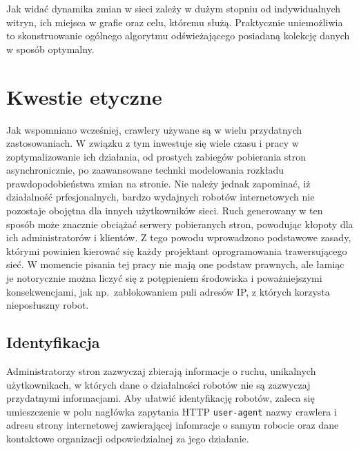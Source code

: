 Jak widać dynamika zmian w sieci zależy w dużym stopniu od indywidualnych witryn, ich miejsca w grafie oraz
celu, któremu służą. Praktycznie uniemożliwia to skonstruowanie ogólnego algorytmu odświeżającego posiadaną
kolekcję danych w sposób optymalny.


\section{Kwestie etyczne}
\label{sec:etyczne}
Jak wspomniano wcześniej, crawlery używane są w wielu przydatnych zastosowaniach. W związku z tym inwestuje się wiele czasu i pracy w zoptymalizowanie
ich działania, od prostych zabiegów pobierania stron asynchronicznie, po zaawansowane technki modelowania rozkładu prawdopodobieństwa zmian na stronie.
Nie należy jednak zapominać, iż działalność prfesjonalnych, bardzo wydajnych robotów internetowych nie pozostaje obojętna dla innych użytkowników 
sieci. Ruch generowany w ten sposób może znacznie obciążać serwery pobieranych stron, powodując kłopoty dla ich administratorów i klientów.
Z tego powodu wprowadzono podstawowe zasady, którymi powinien kierować się każdy projektant oprogramowania trawersującego sieć. W momencie pisania
tej pracy nie mają one podstaw prawnych, ale łamiąc je notorycznie można liczyć się z potępieniem środowiska i poważniejszymi konsekwencjami, jak np.~zablokowaniem
puli adresów IP, z których korzysta nieposłuszny robot.


\subsection{Identyfikacja}
\label{subsec:identyfikacja}

Administratorzy stron zazwyczaj zbierają informacje o ruchu, unikalnych użytkownikach, w których dane o działalności robotów nie są zazwyczaj przydatnymi
informacjami. Aby ułatwić identyfikację robotów, zaleca się umieszczenie w polu nagłówka zapytania HTTP \texttt{user-agent} nazwy crawlera i adresu
strony internetowej zawierającej infomracje o samym robocie oraz dane kontaktowe organizacji odpowiedzialnej za jego działanie.


